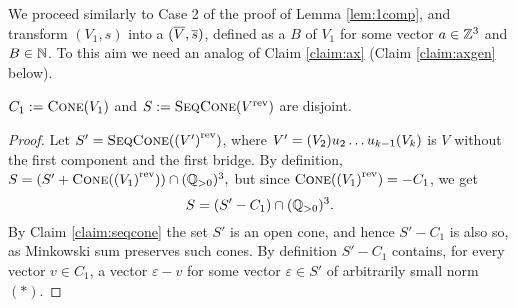 \begin{appendixproof}
%
We proceed similarly to Case 2 of the proof of Lemma \ref{lem:1comp}, and transform
$(V_1,s)$ into a \geomvass $(\overline{V}, \overline{s})$, defined as a  {$B$} of $V_1$
for some vector $a\in\mathbb{Z}^3$ and $B\in\mathbb{N}$.
To this aim we need an analog of Claim \ref{claim:ax} (Claim \ref{claim:axgen} below).
%
\begin{claim}\label{claim:empty_intersection}
$C_1 :=  \textsc{Cone}(V_1)$ and $S := \textsc{SeqCone}({V}^{\text{rev}})$ are disjoint.
\end{claim}

\begin{proof}
Let $S'=\textsc{SeqCone}({(V')}^{\text{rev}})$, where $V'=(V_2) u_2 \ldots u_{k-1} (V_k)$ is $V$ without the first component and the first bridge.
By definition, 
$
S = (S' + \textsc{Cone}({(V_1)}^{\text{rev}}))\cap(\mathbb{Q}_{>0})^3,
$
but since $\textsc{Cone}({(V_1)}^{\text{rev}}) = -C_1$, we get
\[
S = (S' - C_1)\cap(\mathbb{Q}_{>0})^3.
\]
By Claim \ref{claim:seqcone} the set $S'$ is an open cone, and hence
$S' - C_1$ is also so, as Minkowski sum preserves such cones.
By definition $S' - C_1$ contains, for every vector $v\in C_1$, 
a vector $\varepsilon-v$ for some vector $\varepsilon\in S'$ of arbitrarily small norm $(*)$.


\end{proof}
\end{appendixproof}
